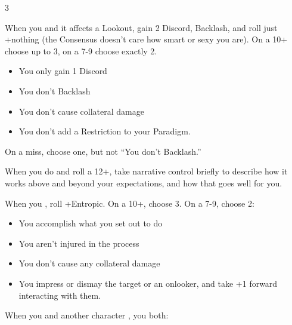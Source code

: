 \begin{multicols}{3}
  \SEPARATOR

  \begin{move}
    When you  and it affects a Lookout, gain 2 Discord, Backlash, and roll just +nothing (the Consensus doesn’t care how smart or sexy you are). On a 10+ choose up to 3, on a 7-9 choose exactly 2. 

    \begin{itemize}
      \setlength\itemsep{0em}
    \item You only gain 1 Discord
    \item You don’t Backlash
    \item You don’t cause collateral damage
    \item You don’t add a Restriction to your Paradigm. 
    \end{itemize}
On a miss, choose one, but not “You don’t Backlash.”

  \end{move}

  \SEPARATOR

  \begin{move}
    When you do  and roll a 12+, take narrative control briefly to describe how it works above and beyond your expectations, and how that goes well for you.

  \end{move}

  \columnbreak
  
  \begin{move}
     When you , roll +Entropic. On a 10+, choose 3. On a 7-9, choose 2:

    \begin{itemize}
      \setlength\itemsep{0em}
    \item You accomplish what you set out to do
    \item You aren’t injured in the process
    \item You don’t cause any collateral damage
    \item You impress or dismay the target or an onlooker, and take +1 forward interacting with them.
    \end{itemize}
  \end{move}

  \SEPARATOR

  \begin{move}
     When you and another character , you both:


\end{move}
\end{multicols}
